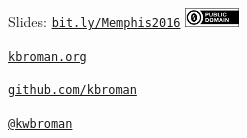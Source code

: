 \documentclass[12pt,t]{beamer}
\begin{document}
\begin{frame}[c]{}

\Large

Slides: \href{http://bit.ly/Memphis2016}{\tt bit.ly/Memphis2016} \quad
\includegraphics[height=5mm]{Figs/cc-zero.png}

\vspace{10mm}

\href{http://kbroman.org}{\tt kbroman.org}

\vspace{10mm}

\href{https://github.com/kbroman}{\tt github.com/kbroman}

\vspace{10mm}

\href{https://twitter.com/kwbroman}{\tt @kwbroman}


\end{frame}
\end{document}
